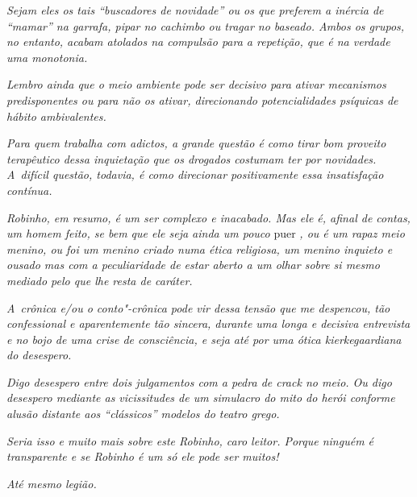 \emph{Sejam eles os tais ``buscadores de novidade'' ou os que preferem a
inércia de ``mamar'' na garrafa, pipar no cachimbo ou tragar no baseado.
Ambos os grupos, no entanto, acabam atolados na compulsão para a
repetição, que é na verdade uma monotonia.}

\emph{Lembro ainda que o meio ambiente pode ser decisivo para ativar
mecanismos predisponentes ou para não os ativar, direcionando
potencialidades psíquicas de hábito ambivalentes.}

\emph{Para quem trabalha com adictos, a grande questão é como tirar bom
proveito terapêutico dessa inquietação que os drogados costumam ter por
novidades. A~difícil questão, todavia, é como direcionar positivamente
essa insatisfação contínua.}

\emph{Robinho, em resumo, é um ser complexo e inacabado. Mas ele é,
afinal de contas, um homem feito, se bem que ele seja ainda um pouco} 
puer \emph{, ou é um rapaz meio menino, ou foi um menino criado numa ética
religiosa, um menino inquieto e ousado mas com a peculiaridade de estar
aberto a um olhar sobre si mesmo mediado pelo que lhe resta de
caráter.}

\emph{A~crônica e/ou o conto"-crônica pode vir dessa tensão que me
despencou, tão confessional e aparentemente tão sincera, durante uma
longa e decisiva entrevista e no bojo de uma crise de consciência, e
seja até por uma ótica kierkegaardiana do desespero.}

\emph{Digo desespero entre dois julgamentos com a pedra de crack no
meio. Ou digo desespero mediante as vicissitudes de um simulacro do mito
do herói conforme alusão distante aos ``clássicos'' modelos do teatro
grego.}

\emph{Seria isso e muito mais sobre este Robinho, caro leitor. Porque
ninguém é transparente e se Robinho é um só ele pode ser muitos!}

\emph{Até mesmo legião.~}
 

 

 
